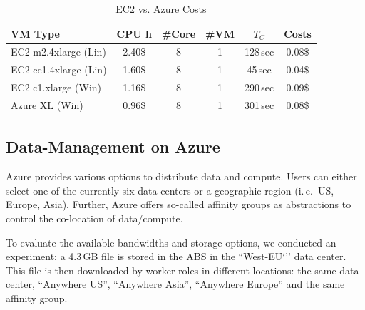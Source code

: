 \documentclass[conference,final]{IEEEtran}
\newcommand{\up}{\vspace*{-1em}}
\newcommand{\tc}{$T_{C}$ }
\begin{document}
\begin{table}[ht]
    \centering
	\begin{scriptsize}
		\begin{tabular}{|l|c|c|c|c|c|}
	        \hline
	        VM Type                 &CPU h  &\#Core &\#VM &\tc &Costs  \\ \hline
	        EC2 m2.4xlarge (Lin)  &2.40\$  &8          &1      &128\,sec     &0.08\$ \\ \hline
	        EC2 cc1.4xlarge (Lin) &1.60\$  &8          &1      &45\,sec     &0.04\$ \\ \hline
	        EC2 c1.xlarge   (Win)   &1.16\$  &8          &1      &290\,sec    &0.09\$ \\ \hline
	        Azure XL (Win)  &0.96\$ &8          &1      &301\,sec    &0.08\$ \\ \hline
		\end{tabular}
	\end{scriptsize}
	\caption{EC2 vs. Azure Costs\label{tbl:costs}}
	\up
\end{table}

\subsection{Data-Management on Azure}
\up Azure provides various options to distribute data and
compute. Users can either select one of the currently six data centers
or a geographic region (i.\,e.\ US, Europe, Asia). Further, Azure
offers so-called affinity groups as abstractions to control the
co-location of data/compute.

To evaluate the available bandwidths and storage options, we conducted
an experiment: a 4.3\,GB file is stored in the ABS in 
the ``West-EU`'' data center. This file is then
downloaded by worker roles in different locations: the same data center,
``Anywhere US'', ``Anywhere Asia'', ``Anywhere Europe'' and 
the same affinity group.
\end{document}

